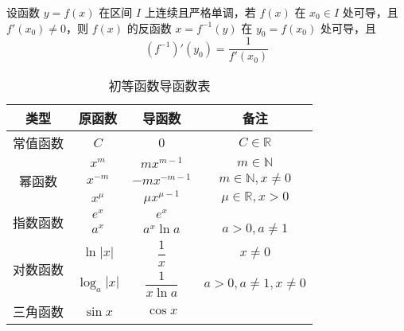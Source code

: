 \begin{theorem}
  设函数 $y = f(x)$ 在区间 $I$ 上连续且严格单调，若 $f(x)$ 在 $x_0\in I$ 处可导，且 $f'(x_0) \ne 0$，则 $f(x)$ 的反函数 $x = f^{-1}(y)$ 在 $y_0 = f(x_0)$ 处可导，且
  \[\left(f^{-1}\right)'(y_0) = \dfrac{1}{f'(x_0)}\]
\end{theorem}

\begin{table}
  \centering
  \caption{初等函数导函数表}
  \renewcommand\arraystretch{1.8}
  \begin{tabular}{|c|c|c|c|}
    \hline
    类型                        & 原函数                                              & 导函数                       & 备注                                           \\
    \hline
    常值函数                    & $C$                                                 & $0$                          & $C\in \mathbb{R}$                              \\
    \hline
    \multirow{3}{*}{幂函数}     & $x^m$                                               & $mx^{m - 1}$                 & $m \in \mathbb{N}$                             \\
                                & $x^{-m}$                                            & $-mx^{-m - 1}$               & $m \in \mathbb{N},x \ne 0$                     \\
                                & $x^\mu$                                             & $\mu x^{\mu - 1}$            & $\mu \in \mathbb{R}, x > 0$                    \\
    \hline
    \multirow{2}{*}{指数函数}   & $e^x$                                               & $e^x$                        &                                                \\
                                & $a^x$                                               & $a^x\ln a$                   & $a > 0, a \ne 1$                               \\
    \hline
    \multirow{2}{*}{对数函数}   & $\ln |x|$                                           & $\dfrac{1}{x}$               & $x \ne 0$                                      \\[8pt]
                                & $\log_a|x|$                                         & $\dfrac{1}{x\ln a}$          & $a > 0, a \ne 1, x \ne 0$                      \\[5pt]
    \hline
    \multirow{4}{*}{三角函数}   & $\sin x$                                            & $\cos x$                     &                                                \\

\end{tabular}
\end{table}
